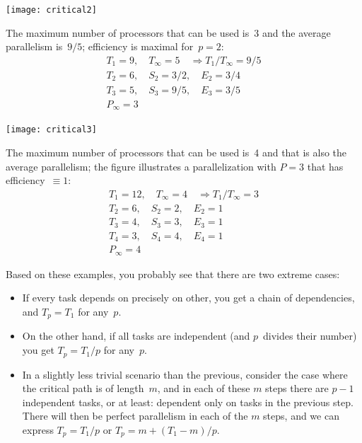\begin{minipage}{\textwidth}
  \begin{minipage}{.25\textwidth}
    \texttt{[image: critical2]}
  \end{minipage}
  \begin{minipage}{.75\textwidth}
    The maximum number of processors that can be used is~3 and the
    average parallelism is~$9/5$; efficiency is maximal for~$p=2$:
    \[
    \begin{array}{l}
      T_1=9,\quad T_\infty=5 \quad\Rightarrow T_1/T_\infty=9/5\\
      T_2=6,\quad S_2=3/2,\quad E_2=3/4\\
      T_3=5,\quad S_3=9/5,\quad E_3=3/5\\
      P_\infty=3
    \end{array}
    \]
  \end{minipage}
\end{minipage}

\begin{minipage}{\textwidth}
  \begin{minipage}{.4\textwidth}
    \texttt{[image: critical3]}
  \end{minipage}
  \begin{minipage}{.6\textwidth}
    The maximum number of processors that can be used is~4
    and that is also the average parallelism;
    the figure illustrates a parallelization with $P=3$ that
    has efficiency~$\equiv1$:
    \[
    \begin{array}{l}
      T_1=12,\quad T_\infty=4 \quad\Rightarrow T_1/T_\infty=3\\
      T_2=6,\quad S_2=2,\quad E_2=1\\
      T_3=4,\quad S_3=3,\quad E_3=1\\
      T_4=3,\quad S_4=4,\quad E_4=1\\
      P_\infty=4
    \end{array}
    \]
  \end{minipage}
\end{minipage}

Based on these examples, you probably see that there are two extreme cases:
\begin{itemize}
\item If every task depends on precisely on other, you get a chain
  of dependencies, and $T_p=T_1$ for any~$p$.
\item On the other hand, if all tasks are independent (and $p$~divides
  their number) you get $T_p=T_1/p$ for any~$p$.
\item In a slightly less trivial scenario than the previous,
  consider the case where
  the critical path is of length~$m$, and in each of these $m$ steps
  there are $p-1$ independent tasks, or at least: dependent only on
  tasks in the previous step. There will then be perfect parallelism
  in each of the $m$ steps, and we can express $T_p = T_1/p$
  or $T_p= m+ (T_1-m)/p$.
\end{itemize}

